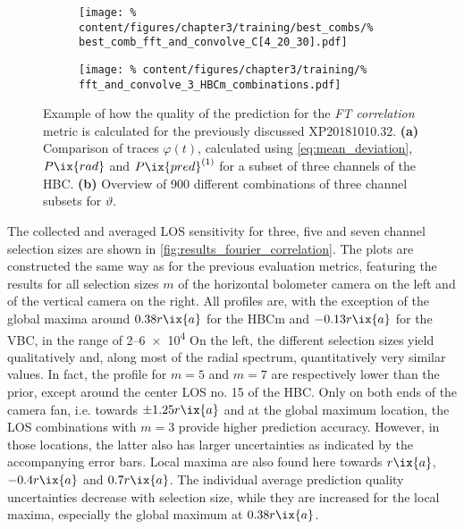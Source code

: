             \begin{figure}[t]%
                \centering%
                \begin{subfigure}{0.43\textwidth}%
                    \texttt{[image: \%
                        content/figures/chapter3/training/best\_combs/\%
                        best\_comb\_fft\_and\_convolve\_C[4\_20\_30].pdf]}%
                    \caption{}%
                \end{subfigure}%
                \hfill%
                \begin{subfigure}{0.47\textwidth}%
                    \texttt{[image: \%
                        content/figures/chapter3/training/\%
                        fft\_and\_convolve\_3\_HBCm\_combinations.pdf]}%
                    \caption{}%
                \end{subfigure}%
                \caption{Example of how the quality of the prediction for the \textit{FT correlation} metric is calculated for the previously discussed XP20181010.32. \textbf{(a)} Comparison of traces $\varphi\left(t\right)$, calculated using \cref{eq:mean_deviation}, $P\ix{rad}$ and $P\ix{pred}^{\left(1\right)}$ for a subset of three channels of the HBC. \textbf{(b)} Overview of 900 different combinations of three channel subsets for $\vartheta$.}\label{fig:fourier_correlation}%
            \end{figure}%
%
            The collected and averaged LOS sensitivity for three, five and seven channel selection sizes are shown in \cref{fig:results_fourier_correlation}. The plots are constructed the same way as for the previous evaluation metrics, featuring the results for all selection sizes $m$ of the horizontal bolometer camera on the left and of the vertical camera on the right. All profiles are, with the exception of the global maxima around $0.38r\ix{a}$ for the HBCm and $-0.13r\ix{a}$ for the VBC, in the range of \SIrange{2}{6e4}{\arbitraryunit} On the left, the different selection sizes yield qualitatively and, along most of the radial spectrum, quantitatively very similar values. In fact, the profile for $m=5$ and $m=7$ are respectively lower than the prior, except around the center LOS no. 15 of the HBC. Only on both ends of the camera fan, i.e. towards $\pm1.25r\ix{a}$ and at the global maximum location, the LOS combinations with $m=3$ provide higher prediction accuracy. However, in those locations, the latter also has larger uncertainties as indicated by the accompanying error bars. Local maxima are also found here towards $r\ix{a}$, $-0.4r\ix{a}$ and $0.7r\ix{a}$. The individual average prediction quality uncertainties decrease with selection size, while they are increased for the local maxima, especially the global maximum at $0.38r\ix{a}$.\\%
